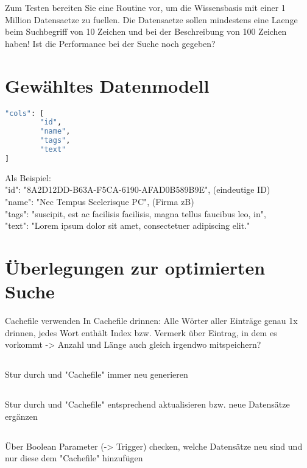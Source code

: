 \documentclass[letterpaper, 12pt]{article}
\let\tempsection\section
\renewcommand\section[1]{\vspace{-0.3cm}\tempsection{#1}\vspace{-0.3cm}}
\let\tempsubsection\subsection
\renewcommand\subsection[1]{\vspace{0cm}\tempsubsection{#1}\vspace{0cm}}
\begin{document}
Zum Testen bereiten Sie eine Routine vor, um die Wissensbasis mit einer 1 Million Datensaetze zu fuellen. Die Datensaetze sollen mindestens eine Laenge beim Suchbegriff von 10 Zeichen und bei der Beschreibung von 100 Zeichen haben! Ist die Performance bei der Suche noch gegeben?

\newpage
\section{Gewähltes Datenmodell}
\begin{lstlisting}[frame=single, language=bash, caption=Datenmodell]
"cols": [
		"id",
		"name",
		"tags",
		"text"
]
\end{lstlisting} 
Als Beispiel: \\

"id": "8A2D12DD-B63A-F5CA-6190-AFAD0B589B9E", (eindeutige ID) \\
"name": "Nec Tempus Scelerisque PC", (Firma zB) \\
"tags": "suscipit, est ac facilisis facilisis, magna tellus faucibus leo, in", \\
"text": "Lorem ipsum dolor sit amet, consectetuer adipiscing elit." \\

\section{Überlegungen zur optimierten Suche}
Cachefile verwenden
In Cachefile drinnen: 
Alle Wörter aller Einträge genau 1x drinnen, jedes Wort enthält Index bzw. Vermerk über Eintrag, in dem es vorkommt
-> Anzahl und Länge auch gleich irgendwo mitspeichern?

\subsection{}
Stur durch und "Cachefile" immer neu generieren

\subsection{}
Stur durch und "Cachefile" entsprechend aktualisieren bzw. neue Datensätze ergänzen

\subsection{}
Über Boolean Parameter (-> Trigger) checken, welche Datensätze neu sind und nur diese dem "Cachefile" hinzufügen
\end{document}
